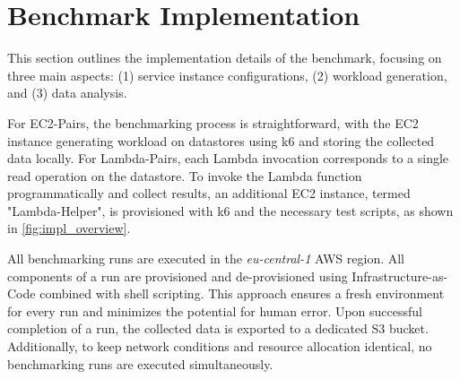 \section{Benchmark Implementation}
\label{cha:implementation}

This section outlines the implementation details of the benchmark, focusing on three main aspects: (1) service instance configurations, (2) workload generation, and (3) data analysis.

For EC2-Pairs, the benchmarking process is straightforward, with the EC2 instance generating workload on datastores using k6 and storing the collected data locally. For Lambda-Pairs, each Lambda invocation corresponds to a single read operation on the datastore. To invoke the Lambda function programmatically and collect results, an additional EC2 instance, termed "Lambda-Helper", is provisioned with k6 and the necessary test scripts, as shown in \cref{fig:impl_overview}.

All benchmarking runs are executed in the \textit{eu-central-1} AWS region. All components of a run are provisioned and de-provisioned using Infrastructure-as-Code combined with shell scripting. This approach ensures a fresh environment for every run and minimizes the potential for human error. Upon successful completion of a run, the collected data is exported to a dedicated S3 bucket. Additionally, to keep network conditions and resource allocation identical, no benchmarking runs are executed simultaneously.


